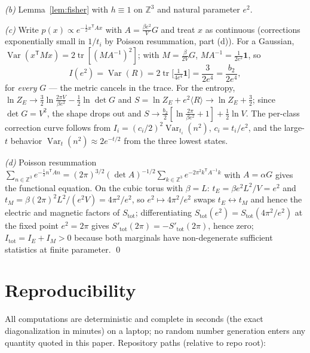 \documentclass[11pt]{article}
\theoremstyle{remark}
\theoremstyle{plain}
\newcommand{\Var}{\operatorname{Var}}
\newcommand{\Z}{\mathbb{Z}}
\begin{document}
\emph{(b)} Lemma~\ref{lem:fisher} with $h \equiv 1$ on $\Z^3$ and natural parameter $e^2$.

\emph{(c)} Write $p(x) \propto e^{-\frac12 x^{\mathsf T} A x}$ with $A = \frac{\beta e^2}{V} G$ and treat $x$ as continuous (corrections exponentially small in $1/t_i$ by Poisson resummation, part (d)). For a Gaussian, $\Var(x^{\mathsf T} M x) = 2 \operatorname{tr}[(M A^{-1})^2]$; with $M = \frac{\beta}{2V} G$, $MA^{-1} = \frac{1}{2e^2}\mathbf 1$, so
\[
I(e^2) = \Var(R) = 2 \operatorname{tr}\Big[\tfrac{1}{4e^4}\mathbf 1\Big] = \frac{3}{2e^4} = \frac{b_2}{2e^4},
\]
for \emph{every} $G$ --- the metric cancels in the trace. For the entropy, $\ln Z_E \to \frac32 \ln \frac{2\pi V}{\beta e^2} - \frac12 \ln \det G$ and $S = \ln Z_E + e^2 \langle R\rangle \to \ln Z_E + \frac32$; since $\det G = V^2$, the shape drops out and $S \to \frac{b_2}{2}[\ln\frac{2\pi}{\beta e^2} + 1] + \frac12 \ln V$. The per-class correction curve follows from $I_i = (c_i/2)^2 \Var_{t_i}(n^2)$, $c_i = t_i/e^2$, and the large-$t$ behavior $\Var_t(n^2) \approx 2e^{-t/2}$ from the three lowest states.

\emph{(d)} Poisson resummation $\sum_{n \in \Z^3} e^{-\frac12 n^{\mathsf T} \! A n} = (2\pi)^{3/2} (\det A)^{-1/2} \sum_{k \in \Z^3} e^{-2\pi^2 k^{\mathsf T} \! A^{-1} k}$ with $A = \alpha G$ gives the functional equation. On the cubic torus with $\beta = L$: $t_E = \beta e^2 L^2 / V = e^2$ and $t_M = \beta (2\pi)^2 L^2 / (e^2 V) = 4\pi^2/e^2$, so $e^2 \mapsto 4\pi^2/e^2$ swaps $t_E \leftrightarrow t_M$ and hence the electric and magnetic factors of $S_{\mathrm{tot}}$; differentiating $S_{\mathrm{tot}}(e^2) = S_{\mathrm{tot}}(4\pi^2/e^2)$ at the fixed point $e^2 = 2\pi$ gives $S'_{\mathrm{tot}}(2\pi) = -S'_{\mathrm{tot}}(2\pi)$, hence zero; $I_{\mathrm{tot}} = I_E + I_M > 0$ because both marginals have non-degenerate sufficient statistics at finite parameter. \qed

\section{Reproducibility}\label{app:repro}

All computations are deterministic and complete in seconds (the exact diagonalization in minutes) on a laptop; no random number generation enters any quantity quoted in this paper. Repository paths (relative to repo root):
\end{document}
